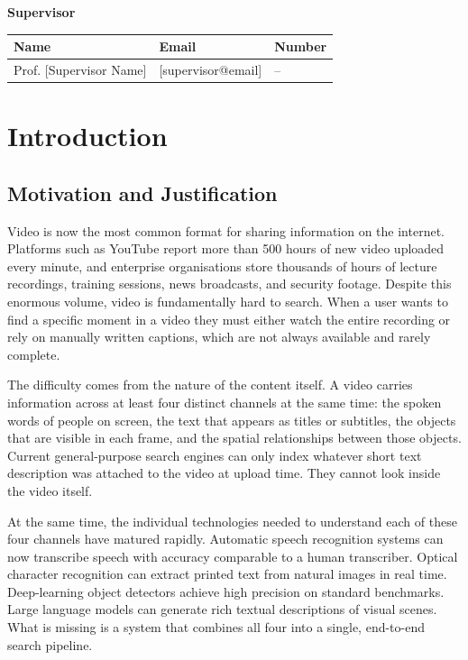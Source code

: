 \documentclass[12pt, a4paper]{report}
\begin{document}
\vspace{2em}
\textbf{Supervisor}

\vspace{0.5em}
\begin{tabular}{lll}
  \toprule
  \textbf{Name} & \textbf{Email} & \textbf{Number} \\
  \midrule
  Prof. [Supervisor Name] & [supervisor@email] & -- \\
  \bottomrule
\end{tabular}

\newpage

\setcounter{page}{1}

\chapter{Introduction}

\section{Motivation and Justification}

Video is now the most common format for sharing information on the internet.
Platforms such as YouTube report more than 500 hours of new video uploaded
every minute, and enterprise organisations store thousands of hours of
lecture recordings, training sessions, news broadcasts, and security footage.
Despite this enormous volume, video is fundamentally hard to search. When
a user wants to find a specific moment in a video they must either watch
the entire recording or rely on manually written captions, which are not
always available and rarely complete.

The difficulty comes from the nature of the content itself. A video carries
information across at least four distinct channels at the same time: the
spoken words of people on screen, the text that appears as titles or subtitles,
the objects that are visible in each frame, and the spatial relationships
between those objects. Current general-purpose search engines can only
index whatever short text description was attached to the video at upload
time. They cannot look inside the video itself.

At the same time, the individual technologies needed to understand each
of these four channels have matured rapidly. Automatic speech recognition
systems can now transcribe speech with accuracy comparable to a human
transcriber. Optical character recognition can extract printed text from
natural images in real time. Deep-learning object detectors achieve high
precision on standard benchmarks. Large language models can generate
rich textual descriptions of visual scenes. What is missing is a system
that combines all four into a single, end-to-end search pipeline.
\end{document}
